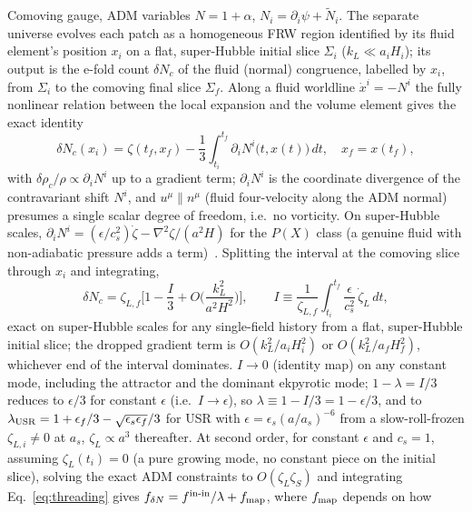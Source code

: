 \documentclass[aps,prd,twocolumn,superscriptaddress,showpacs,preprintnumbers,nofootinbib,longbibliography,floatfix]{revtex4-2}
\newcommand{\eps}{\epsilon}
\begin{document}
Comoving gauge, ADM variables $N=1+\alpha$, $N_i=\partial_i\psi+\tilde N_i$. The
separate universe evolves each patch as a homogeneous FRW region identified by its fluid
element's position $x_i$ on a flat, super-Hubble initial slice $\Sigma_i$ ($k_L\ll a_iH_i$);
its output is the e-fold count $\delta N_c$ of the fluid (normal) congruence, labelled by
$x_i$, from $\Sigma_i$ to the comoving final slice $\Sigma_f$. Along a fluid worldline
$\dot x^i=-N^i$ the fully nonlinear relation between the local expansion and the volume
element gives the exact identity
\begin{equation}
\delta N_c(x_i)=\zeta(t_f,x_f)-\frac13\int_{t_i}^{t_f}\!\partial_iN^i\big(t,x(t)\big)\,dt,
\quad x_f=x(t_f),
\label{eq:threading}
\end{equation}
with $\delta\rho_c/\rho\propto\partial_iN^i$ up to a gradient term; $\partial_iN^i$ is the
coordinate divergence of the contravariant shift $N^i$, and $u^\mu\parallel n^\mu$
(fluid four-velocity along the ADM normal) presumes a single scalar degree of freedom,
i.e.\ no vorticity. On super-Hubble scales,
$\partial_iN^i=(\eps/c_s^2)\dot\zeta-\nabla^2\zeta/(a^2H)$ for the $P(X)$ class (a genuine
fluid with non-adiabatic pressure adds a term)~\cite{Maldacena2003,ChenHuang2007}. Splitting
the interval at the comoving slice through $x_i$ and integrating,
\begin{equation}
\delta N_c=\zeta_{L,f}\Big[1-\frac{I}{3}+O\!\Big(\frac{k_L^2}{a^2H^2}\Big)\Big],\qquad
I\equiv\frac{1}{\zeta_{L,f}}\int_{t_i}^{t_f}\!\frac{\eps}{c_s^2}\,\dot\zeta_L\,dt,
\label{eq:lambda}
\end{equation}
exact on super-Hubble scales for any single-field history from a flat, super-Hubble initial
slice; the dropped gradient term is $O(k_L^2/a_iH_i^2)$ or $O(k_L^2/a_fH_f^2)$, whichever
end of the interval dominates. $I\to0$ (identity map) on any constant mode, including the
attractor and the dominant ekpyrotic mode; $1-\lambda=I/3$ reduces to $\eps/3$ for constant
$\eps$ (i.e.\ $I\to\eps$), so $\lambda\equiv1-I/3=1-\eps/3$, and to
$\lambda_{\rm USR}=1+\eps_f/3-\sqrt{\eps_s\eps_f}/3$ for USR with $\eps=\eps_s(a/a_s)^{-6}$
from a slow-roll-frozen $\zeta_{L,i}\neq0$ at $a_s$, $\zeta_L\propto a^3$ thereafter. At second
order, for constant $\eps$ and $c_s=1$, assuming $\zeta_L(t_i)=0$ (a pure growing mode, no
constant piece on the initial slice), solving the exact ADM constraints to
$O(\zeta_L\zeta_S)$ and integrating Eq.~\eqref{eq:threading} gives
$f_{\delta N}=f^{\rm in\text{-}in}/\lambda+f_{\rm map}$, where $f_{\rm map}$ depends on how
\end{document}
